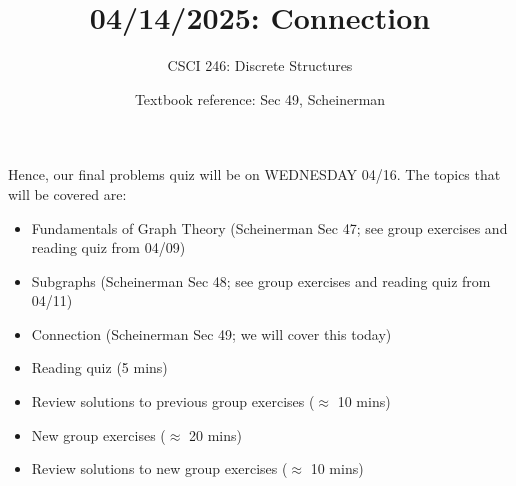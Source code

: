 \documentclass[10pt]{beamer}
\begin{document}




\title{04/14/2025: Connection}
\author{CSCI 246: Discrete Structures}
\date{Textbook reference: Sec 49, Scheinerman}

\begin{frame}
    \titlepage 
\end{frame}


\begin{frame}
\small
\begin{myredbox}[title=Problems Quiz On Wednesday]
 Hence, our final problems quiz will be on WEDNESDAY 04/16.  The topics that will be covered are:
\begin{itemize}
\item Fundamentals of Graph Theory (Scheinerman Sec 47; see group exercises and reading quiz from 04/09)
\item Subgraphs (Scheinerman Sec 48; see group exercises and reading quiz from 04/11) 
\item Connection (Scheinerman Sec 49; we will cover this today)
\end{itemize}
\end{myredbox}
\vfill 
\begin{myyellowbox}[title=Today's Agenda]
\begin{itemize}
	\item Reading quiz (5 mins)
	\item Review solutions to previous group exercises ($\approx$ 10 mins)
	\item New group exercises ($\approx$ 20 mins)
	\item Review solutions to new group exercises ($\approx$ 10 mins)
\end{itemize}


\end{myyellowbox}
\vfill 

\end{frame}
\end{document}
